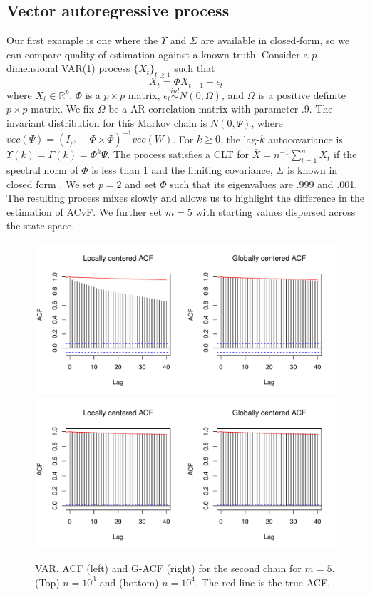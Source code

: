 \documentclass[11pt]{article}
\theoremstyle{remark}
\begin{document}
\subsection{Vector autoregressive process} \label{ex:var}

 
Our first example is one where the $\Upsilon$ and $\Sigma$ are available in closed-form, so we can compare quality of estimation against a known truth. Consider a $p$-dimensional VAR(1) process $\{X_t\}_{t \geq 1}$ such that
%
\[
X_t = \Phi X_{t-1} + \epsilon_t
\]
%
where $X_t \in \mathbb{R}^p$, $\Phi $ is a $p \times p $ matrix, $ \epsilon_t \overset{iid}{\sim} N(0, \Omega)$, and $\Omega$ is a positive definite $p \times p$ matrix. We fix $\Omega$ be a AR correlation matrix with parameter .9. The invariant distribution for this Markov chain is $N(0, \Psi)$, where $vec(\Psi) = (I_{p^2} - \Phi \times \Phi)^{-1} vec(W)$.  For $k \geq 0$, the lag-$k$ autocovariance is $\Upsilon(k) = \Gamma(k) = \Phi^k\Psi$. The process satisfies a CLT for $\bar{X} = n^{-1} \sum_{t=1}^{n} X_t$ if the spectral norm of $\Phi$ is less than 1 \citep{10.2307/1427459} and the limiting covariance, $\Sigma$ is known in closed form \citep{dai:jon:2017}. We set $p = 2$ and set $\Phi$ such that its eigenvalues are .999 and .001. The resulting process mixes slowly and allows us to highlight the difference in the estimation of ACvF. We further set $m = 5$ with starting values dispersed across the state space.  
\begin{figure}[htbp]
\centering
   \includegraphics[width=.5\linewidth]{plots/var-acf_n1000.pdf}
     \includegraphics[width=.5\linewidth]{plots/var-acf_n10000.pdf} 
\caption{VAR. ACF (left) and G-ACF (right) for the second chain for $m = 5$. (Top) $n = 10^3$  and (bottom) $n =  10^4$. The red line is the true ACF.}
\label{fig:var-acf}
\end{figure}
\end{document}
